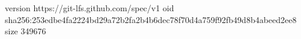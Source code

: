 version https://git-lfs.github.com/spec/v1
oid sha256:253edbe4fa2224bd29a72b2fa2b4b6dec78f70d4a759f92fb49d8b4abeed2ee8
size 349676
